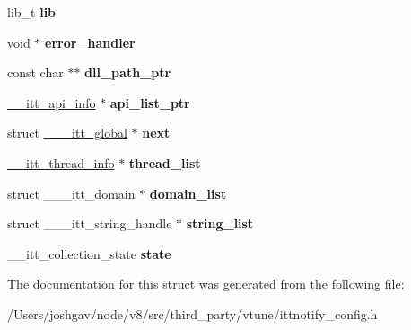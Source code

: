 \begin{DoxyCompactItemize}
\item 
lib\+\_\+t {\bfseries lib}\hypertarget{struct______itt__global_acd607182b03ee49400b6a4ffa69ae5db}{}\label{struct______itt__global_acd607182b03ee49400b6a4ffa69ae5db}

\item 
void $\ast$ {\bfseries error\+\_\+handler}\hypertarget{struct______itt__global_a5218b05dd00a757cd30e4a324d5a0305}{}\label{struct______itt__global_a5218b05dd00a757cd30e4a324d5a0305}

\item 
const char $\ast$$\ast$ {\bfseries dll\+\_\+path\+\_\+ptr}\hypertarget{struct______itt__global_a809581305da5391f26bd268673155ec7}{}\label{struct______itt__global_a809581305da5391f26bd268673155ec7}

\item 
\hyperlink{struct______itt__api__info}{\+\_\+\+\_\+itt\+\_\+api\+\_\+info} $\ast$ {\bfseries api\+\_\+list\+\_\+ptr}\hypertarget{struct______itt__global_aad92b41f5e69bea276e464b4037d0b95}{}\label{struct______itt__global_aad92b41f5e69bea276e464b4037d0b95}

\item 
struct \hyperlink{struct______itt__global}{\+\_\+\+\_\+\+\_\+itt\+\_\+global} $\ast$ {\bfseries next}\hypertarget{struct______itt__global_ab664cd3d54752490af7e535d27d44763}{}\label{struct______itt__global_ab664cd3d54752490af7e535d27d44763}

\item 
\hyperlink{struct______itt__thread__info}{\+\_\+\+\_\+itt\+\_\+thread\+\_\+info} $\ast$ {\bfseries thread\+\_\+list}\hypertarget{struct______itt__global_aa28553355cdc4eb4f7a51911f15ea938}{}\label{struct______itt__global_aa28553355cdc4eb4f7a51911f15ea938}

\item 
struct \+\_\+\+\_\+\+\_\+itt\+\_\+domain $\ast$ {\bfseries domain\+\_\+list}\hypertarget{struct______itt__global_a0eb1e7fa6a1bfd35ec682a3998aae7b6}{}\label{struct______itt__global_a0eb1e7fa6a1bfd35ec682a3998aae7b6}

\item 
struct \+\_\+\+\_\+\+\_\+itt\+\_\+string\+\_\+handle $\ast$ {\bfseries string\+\_\+list}\hypertarget{struct______itt__global_ab2f78024685f31d524cf848564bb24da}{}\label{struct______itt__global_ab2f78024685f31d524cf848564bb24da}

\item 
\+\_\+\+\_\+itt\+\_\+collection\+\_\+state {\bfseries state}\hypertarget{struct______itt__global_af2a97fb07952dc430a28042e12732532}{}\label{struct______itt__global_af2a97fb07952dc430a28042e12732532}

\end{DoxyCompactItemize}


The documentation for this struct was generated from the following file\+:\begin{DoxyCompactItemize}
\item 
/\+Users/joshgav/node/v8/src/third\+\_\+party/vtune/ittnotify\+\_\+config.\+h\end{DoxyCompactItemize}
